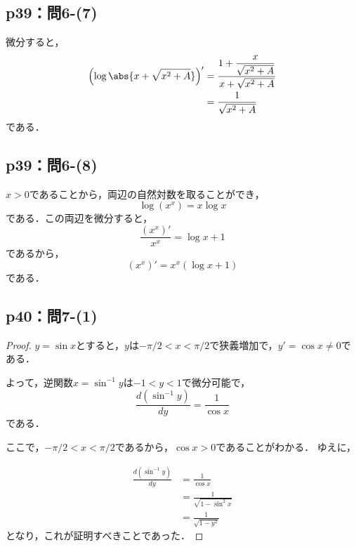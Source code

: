 \documentclass[uplatex,dvipdfmx,a4paper,10pt,fleqn]{jsarticle}
\begin{document}
    \subsection*{p39：問6-(7)}
    
    \begin{tleftbar}
        微分すると，
        \begin{align*} 
           \left  (\log \abs{x+\sqrt{x^2+A}} \right)' & = \frac{1+\dfrac{x}{\sqrt{x^2+A}}}{x+\sqrt{x^2+A}} \\
            & = \frac{1}{\sqrt{x^2+A}}
        \end{align*}
        である．
    \end{tleftbar}

\subsection*{p39：問6-(8)}

\begin{tleftbar}
$x>0$であることから，両辺の自然対数を取ることができ，
\[
    \log (x^x) = x\log x
\]
である．この両辺を微分すると，
\[
    \frac{(x^x)'}{x^x} = \log x +1
\] 
であるから，
\[
    (x^x)' = x^x (\log x+1)
\]
である．
\end{tleftbar}


\subsection*{p40：問7-(1)}

\begin{tleftbar}
    \begin{proof}
    $y = \sin x$とすると，$y$は$-\pi/2 < x < \pi /2$で狭義増加で，$y' = \cos x \ne 0$である．

    よって，逆関数$x = \sin^{-1} y$は$-1 < y < 1$で微分可能で，
    \[
        \frac{d(\sin^{-1} y)}{dy} = \frac{1}{\cos x}
    \]
    である．

    ここで，$-\pi/2 < x < \pi /2$であるから，$\cos x >0$であることがわかる．
    ゆえに，

    \begin{align*} 
        \frac{d(\sin ^{-1} y)}{dy} &= \frac{1}{\cos x} \\
        & = \frac{1}{\sqrt{1-\sin^2 x}} \\
        & = \frac{1}{\sqrt{1-y^2}}
    \end{align*} 
    となり，これが証明すべきことであった．
\end{proof}
\end{tleftbar}
\end{document}
